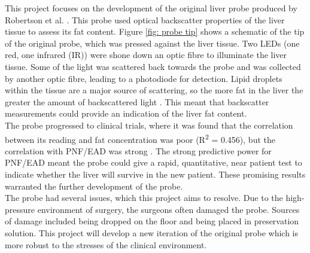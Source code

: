 This project focuses on the development of the original liver probe produced by Robertson et al. \cite{Robertson}. This probe used optical backscatter properties of the liver tissue to assess its fat content. Figure \ref{fig: probe tip} shows a schematic of the tip of the original probe, which was pressed against the liver tissue. Two LEDs (one red, one infrared (IR)) were shone down an optic fibre to illuminate the liver tissue. Some of the light was scattered back towards the probe and was collected by another optic fibre, leading to a photodiode for detection. Lipid droplets within the tissue are a major source of scattering, so the more fat in the liver the greater the amount of backscattered light \cite{McLaughlin}. This meant that backscatter measurements could provide an indication of the liver fat content.\\

The probe progressed to clinical trials, where it was found that the correlation between its reading and fat concentration was poor (R\textsuperscript{2} = 0.456), but the correlation with PNF/EAD was strong \cite{Robertson}. The strong predictive power for PNF/EAD meant the probe could give a rapid, quantitative, near patient test to indicate whether the liver will survive in the new patient. These promising results warranted the further development of the probe.\\

The probe had several issues, which this project aims to resolve. Due to the high-pressure environment of surgery, the surgeons often damaged the probe. Sources of damage included being dropped on the floor and being placed in preservation solution. This project will develop a new iteration of the original probe which is more robust to the stresses of the clinical environment.\\




